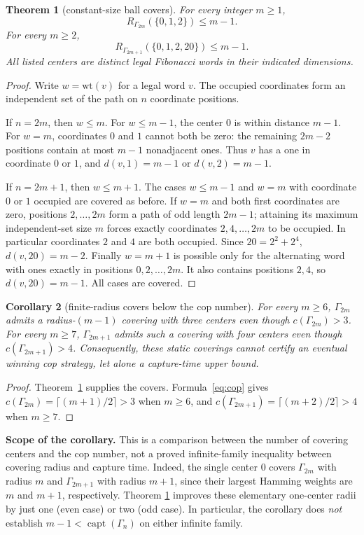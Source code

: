 \documentclass[10pt]{article}
\newtheorem{theorem}{Theorem}
\newtheorem{corollary}[theorem]{Corollary}
\newcommand{\Ga}{\Gamma}
\newcommand{\capt}{\operatorname{capt}}
\begin{document}
\begin{theorem}[constant-size ball covers]\label{thm:cover}
For every integer $m\ge1$,
\[
 R_{\Ga_{2m}}(\{0,1,2\})\le m-1.
\]
For every $m\ge2$,
\[
 R_{\Ga_{2m+1}}(\{0,1,2,20\})\le m-1.
\]
All listed centers are distinct legal Fibonacci words in their indicated dimensions.
\end{theorem}
\begin{proof}
Write $w=\mathrm{wt}(v)$ for a legal word $v$. The occupied coordinates
form an independent set of the path on $n$ coordinate positions.

If $n=2m$, then $w\le m$. For $w\le m-1$, the center $0$
is within distance $m-1$. For $w=m$, coordinates $0$ and $1$ cannot
both be zero: the remaining $2m-2$ positions contain at most $m-1$
nonadjacent ones. Thus $v$ has a one in coordinate $0$ or $1$,
and $d(v,1)=m-1$ or $d(v,2)=m-1$.

If $n=2m+1$, then $w\le m+1$. The cases $w\le m-1$ and
$w=m$ with coordinate $0$ or $1$ occupied are covered as before.
If $w=m$ and both first coordinates are zero, positions
$2,\ldots,2m$ form a path of odd length $2m-1$; attaining its
maximum independent-set size $m$ forces exactly coordinates
$2,4,\ldots,2m$ to be occupied. In particular coordinates $2$ and $4$
are both occupied. Since $20=2^2+2^4$,
$d(v,20)=m-2$. Finally $w=m+1$ is possible only for the alternating
word with ones exactly in positions $0,2,\ldots,2m$.
It also contains positions $2,4$, so $d(v,20)=m-1$.
All cases are covered.
\end{proof}

\begin{corollary}[finite-radius covers below the cop number]\label{cor:gap}
For every $m\ge6$, $\Ga_{2m}$ admits a radius-$(m-1)$ covering
with three centers even though $c(\Ga_{2m})>3$.
For every $m\ge7$, $\Ga_{2m+1}$ admits such a covering with four
centers even though $c(\Ga_{2m+1})>4$.
Consequently, these static coverings cannot certify an eventual
winning cop strategy, let alone a capture-time upper bound.
\end{corollary}
\begin{proof}
Theorem~\ref{thm:cover} supplies the covers. Formula~\eqref{eq:cop}
gives $c(\Ga_{2m})=\lceil(m+1)/2\rceil>3$ when $m\ge6$,
and $c(\Ga_{2m+1})=\lceil(m+2)/2\rceil>4$ when $m\ge7$.
\end{proof}

\noindent\textbf{Scope of the corollary.}
This is a comparison between the number of covering centers and the cop
number, not a proved infinite-family inequality between covering radius
and capture time. Indeed, the single center $0$ covers $\Ga_{2m}$
with radius $m$ and $\Ga_{2m+1}$ with radius $m+1$, since their
largest Hamming weights are $m$ and $m+1$, respectively. Theorem
\ref{thm:cover} improves these elementary one-center radii by just
one (even case) or two (odd case). In particular, the corollary does
\emph{not} establish $m-1<\capt(\Ga_n)$ on either infinite family.
\end{document}
